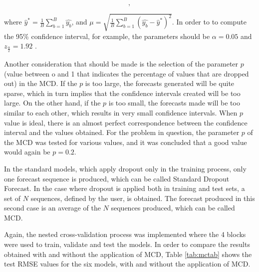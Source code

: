 \begin{equation}
    [\hat{y}^* - z_{\frac{\alpha}{2}}\mu,\ \hat{y}^* + z_{\frac{\alpha}{2}}\mu], 
\end{equation}

where $\hat{y}^* = \frac{1}{B}\sum_{b=1}^B\hat{y_b}$, and $\mu = \sqrt{\frac{1}{B}\sum_{b=1}^B(\hat{y_b} -\hat{y}^*)^2}$. In order to to compute the 95\% confidence interval, for example, the parameters should be $\alpha=0.05$ and $z_{\frac{\alpha}{2}}= 1.92$ . 

Another consideration that should be made is the selection of the parameter $p$ (value between o and 1 that indicates the percentage of values that are dropped out) in the \ac{MCD}. If the $p$ is too large, the forecasts generated will be quite sparse, which in turn implies that the confidence intervals created will be too large. On the other hand, if the $p$ is too small, the forecasts made will be too similar to each other, which results in very small confidence intervals. When $p$ value is ideal, there is an almost perfect correspondence between the confidence interval and the values obtained. For the problem in question, the parameter $p$ of the \ac{MCD} was tested for various values, and it was concluded that a good value would again be $p = 0.2$. 

In the standard models, which apply dropout only in the training process, only one forecast sequence is produced, which can be called Standard Dropout Forecast. In the case where dropout is applied both in training and test sets, a set of $N$ sequences, defined by the user, is obtained. The forecast produced in this second case is an average of the $N$ sequences produced, which can be called \ac{MCD}.

Again, the nested cross-validation process was implemented where the 4 blocks were used to train, validate and test the models. In order to compare the results obtained with and without the application of \ac{MCD}, Table \ref{tab:mctab} shows the test \ac{RMSE} values for the six models, with and without the application of \ac{MCD}.

